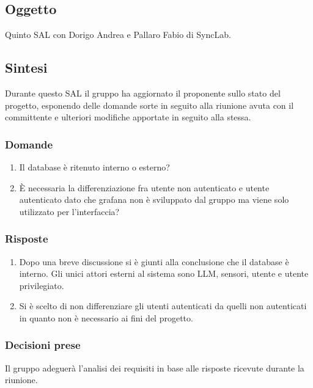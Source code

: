 \documentclass[10pt]{article}
\begin{document}
\subsection{Oggetto}
Quinto SAL con Dorigo Andrea e Pallaro Fabio di SyncLab.

\subsection{Sintesi}
Durante questo SAL il gruppo ha aggiornato il proponente sullo stato del progetto, esponendo delle domande sorte in seguito alla riunione avuta con il committente e ulteriori modifiche apportate in seguito alla stessa.

\subsubsection{Domande}
\begin{enumerate}
  \item Il database è ritenuto interno o esterno?
  \item È necessaria la differenziazione fra utente non autenticato e utente autenticato dato che grafana non è sviluppato dal gruppo ma viene solo utilizzato per l'interfaccia?
\end{enumerate}

\subsubsection{Risposte}
\begin{enumerate}
  \item Dopo una breve discussione si è giunti alla conclusione che il database è interno. Gli unici attori esterni al sistema sono LLM, sensori, utente e utente privilegiato.
  \item Si è scelto di non differenziare gli utenti autenticati da quelli non autenticati in quanto non è necessario ai fini del progetto.
\end{enumerate}

\subsubsection{Decisioni prese}
Il gruppo adeguerà l'analisi dei requisiti in base alle risposte ricevute durante la riunione.

\pagebreak
\end{document}
